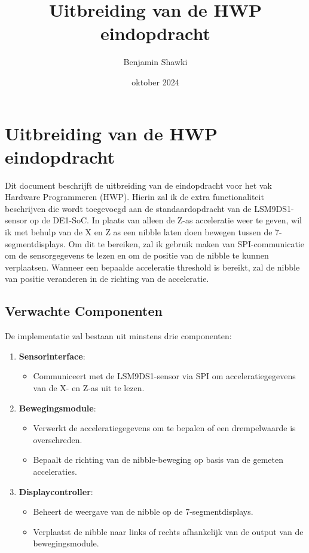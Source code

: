 \documentclass{article}
\title{Uitbreiding van de HWP eindopdracht}
\author{Benjamin Shawki}
\date{oktober 2024}
\begin{document}
\section*{Uitbreiding van de HWP eindopdracht}

Dit document beschrijft de uitbreiding van de eindopdracht voor het vak Hardware Programmeren (HWP). Hierin zal ik de extra functionaliteit beschrijven die wordt toegevoegd aan de standaardopdracht van de LSM9DS1-sensor op de DE1-SoC. In plaats van alleen de Z-as acceleratie weer te geven, wil ik met behulp van de X en Z as een nibble laten doen bewegen tussen de 7-segmentdisplays. Om dit te bereiken, zal ik gebruik maken van SPI-communicatie om de sensorgegevens te lezen en om de positie van de nibble te kunnen verplaatsen. Wanneer een bepaalde acceleratie threshold is bereikt, zal de nibble van positie veranderen in de richting van de acceleratie.

\subsection*{Verwachte Componenten}

De implementatie zal bestaan uit minstens drie componenten:

\begin{enumerate}
    \item \textbf{Sensorinterface}:
    \begin{itemize}
        \item Communiceert met de LSM9DS1-sensor via SPI om acceleratiegegevens van de X- en Z-as uit te lezen.
    \end{itemize}

    \item \textbf{Bewegingsmodule}:
    \begin{itemize}
        \item Verwerkt de acceleratiegegevens om te bepalen of een drempelwaarde is overschreden.
        \item Bepaalt de richting van de nibble-beweging op basis van de gemeten acceleraties.
    \end{itemize}

    \item \textbf{Displaycontroller}:
    \begin{itemize}
        \item Beheert de weergave van de nibble op de 7-segmentdisplays.
        \item Verplaatst de nibble naar links of rechts afhankelijk van de output van de bewegingsmodule.
    \end{itemize}

\end{enumerate}
\end{document}
